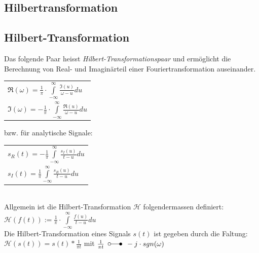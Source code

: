 		
		\subsection{Hilbertransformation}
		\subsection{Hilbert-Transformation}
		Das folgende Paar heisst \textit{Hilbert-Transformationspaar} und ermöglicht die Berechnung von Real- und Imaginärteil
		einer Fouriertransformation auseinander. \\ 
		
		\begin{tabular}{|l|} \hline
			$\Re(\omega) = \frac{1}{\pi} \cdot \int\limits_{-\infty}^{\infty} \frac{\Im(u)}{\omega-u}du$ \\
			$\Im(\omega) = -\frac{1}{\pi} \cdot \int\limits_{-\infty}^{\infty} \frac{\Re(u)}{\omega-u}du$ \\ \hline
		\end{tabular}
		\hspace{5mm}bzw. für analytische Signale: \hspace{5mm}
		\begin{tabular}{|l|} \hline
			$s_R(t) = - \frac{1}{\pi} \int\limits_{-\infty}^{\infty} \frac{s_I(u)}{t-u} du$ \\
			$s_I(t) = \frac{1}{\pi} \int\limits_{-\infty}^{\infty} \frac{s_R(u)}{t-u} du$ \\ \hline
		\end{tabular} \\
		
		Allgemein ist die Hilbert-Transformation $\mathcal{H}$ folgendermassen definiert: \\
		$\mathcal{H}(f(t)) := \frac{1}{\pi} \cdot \int\limits_{-\infty}^{\infty} \frac{f(u)}{t-u}du$ \\
		Die Hilbert-Transformation eines Signals $s(t)$ ist gegeben durch die Faltung: \\
		$\mathcal{H}(s(t)) = s(t) * \frac{1}{\pi t}$ mit $\frac{1}{\pi t} \: \; \laplace \; \: -j \cdot sgn(\omega)$ \\
		
